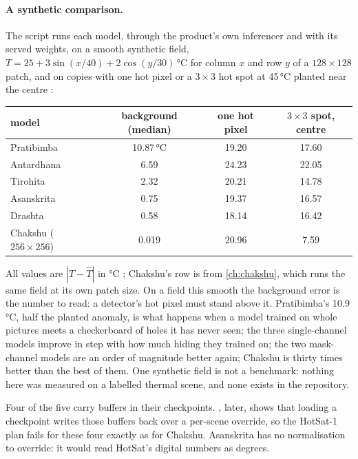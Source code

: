 \paragraph{A synthetic comparison.} The script runs each model, through the product's own inferencer and with its
served weights, on a smooth synthetic field, $T=25+3\sin(x/40)+2\cos(y/30)$\,°C for column $x$ and row $y$ of a
$128\times128$ patch, and on copies with one hot pixel or a $3\times3$ hot spot at 45\,°C planted near the centre
\tagA:
\begin{center}\small
\begin{tabular}{@{}lccc@{}}
\toprule
model & background (median) & one hot pixel & $3\times3$ spot, centre\\
\midrule
Pratibimba & 10.87\,°C & 19.20 & 17.60\\
Antardhana & 6.59 & 24.23 & 22.05\\
Tirohita & 2.32 & 20.21 & 14.78\\
Asanskrita & 0.75 & 19.37 & 16.57\\
Drashta & 0.58 & 18.14 & 16.42\\
\midrule
Chakshu ($256\times256$) & 0.019 & 20.96 & 7.59\\
\bottomrule
\end{tabular}
\end{center}
All values are $|T-\hat T|$ in °C \tagC; Chakshu's row is from \cref{ch:chakshu}, which runs the same field at its own
patch size. On a field this smooth the background error is the number to read: a detector's hot pixel must stand above
it. Pratibimba's 10.9\,°C, half the planted anomaly, is what happens when a model trained on whole pictures meets a
checkerboard of holes it has never seen; the three single-channel models improve in step with how much hiding they
trained on; the two mask-channel models are an order of magnitude better again; Chakshu is thirty times better
than the best of them. One synthetic field is not a benchmark: nothing here was measured on a labelled thermal scene,
and none exists in the repository.

\begin{sourcenote}
Four of the five carry  buffers in their checkpoints. , later, shows that loading a
checkpoint writes those buffers back over a per-scene override, so the HotSat-1 plan fails for these four exactly as
for Chakshu. Asanskrita has no normalisation to override: it would read HotSat's digital numbers as degrees.
\end{sourcenote}

